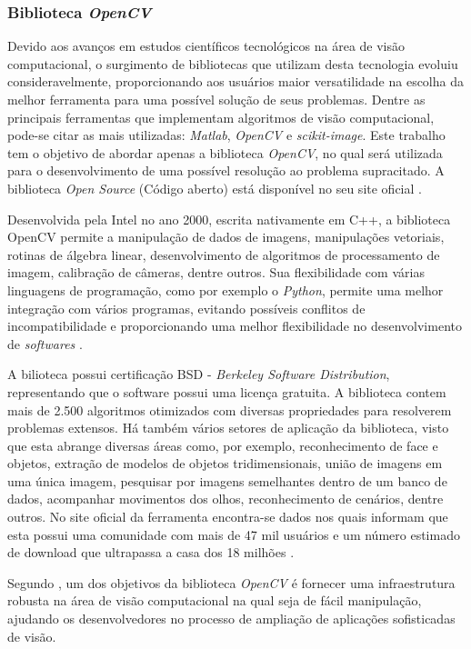 \subsubsection{{Biblioteca \textit{OpenCV}}}

Devido aos avanços em estudos científicos tecnológicos na área de visão computacional, o surgimento de bibliotecas que utilizam desta tecnologia evoluiu consideravelmente, proporcionando aos usuários maior versatilidade na escolha da melhor ferramenta para uma possível solução de seus problemas. Dentre as principais ferramentas que implementam algoritmos de visão computacional, pode-se citar as mais utilizadas: \textit{Matlab}, \textit{OpenCV} e \textit{scikit-image}. Este trabalho tem o objetivo de abordar apenas a biblioteca \textit{OpenCV}, no qual será utilizada para o desenvolvimento de uma possível resolução ao problema supracitado. A biblioteca \textit{Open Source} (Código aberto) está disponível no seu site oficial .

Desenvolvida pela Intel no ano 2000, escrita nativamente em C++, a biblioteca OpenCV permite a manipulação de dados de imagens, manipulações vetoriais, rotinas de álgebra linear, desenvolvimento de algoritmos de processamento de imagem, calibração de câmeras, dentre outros. Sua flexibilidade com várias linguagens de programação, como por exemplo o \textit{Python}, permite uma melhor integração com vários programas, evitando possíveis conflitos de incompatibilidade e proporcionando uma melhor flexibilidade no desenvolvimento de \textit{softwares} \cite{BARBOZA2009}.

A bilioteca possui certificação BSD - \textit{Berkeley Software Distribution}, representando que o software possui uma licença gratuita. A biblioteca contem mais de 2.500 algoritmos otimizados com diversas propriedades para resolverem problemas extensos. Há também vários setores de aplicação da biblioteca, visto que esta abrange diversas áreas como, por exemplo, reconhecimento de face e objetos, extração de modelos de objetos tridimensionais, união de imagens em uma única imagem, pesquisar por imagens semelhantes dentro de um banco de dados, acompanhar movimentos dos olhos, reconhecimento de cenários, dentre outros. No site oficial da ferramenta encontra-se dados nos quais informam que esta possui uma comunidade com mais de 47 mil usuários e um número estimado de download que ultrapassa a casa dos 18 milhões \cite{CUNHA2013}.

Segundo , um dos objetivos da biblioteca \textit{OpenCV} é fornecer uma infraestrutura robusta na área de visão computacional na qual seja de fácil manipulação, ajudando os desenvolvedores no processo de ampliação de aplicações sofisticadas de visão.